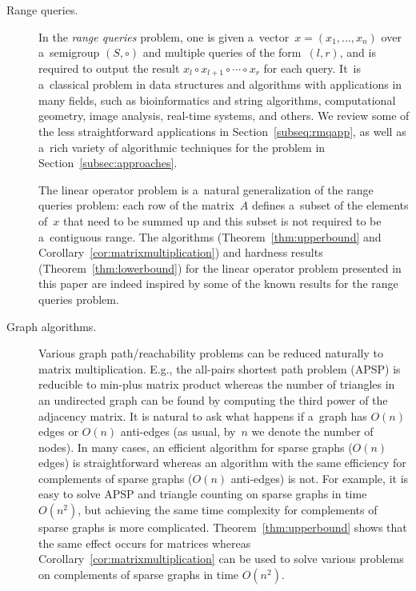 \documentclass[11pt,letterpaper]{article}
\begin{document}
\begin{description}
\item[Range queries.] In the \emph{range queries} problem,
one is given a~vector~$x=(x_1, \dotsc, x_n)$ over a~semigroup $(S, \circ)$ and
multiple queries of the form~$(l,r)$, and is required to
output the result $x_l \circ x_{l+1} \circ \dotsb \circ x_r$
for each query. It~is a~classical problem in data structures and
algorithms with applications in many fields, such as bioinformatics and
string algorithms, computational geometry, image analysis, real-time
systems, and others. We review some of the less straightforward applications in Section~\ref{subseq:rmqapp},
as well as a~rich variety of algorithmic techniques for the problem in
Section~\ref{subsec:approaches}.

The linear operator problem is a~natural generalization of the range queries
problem: each row of the matrix~$A$ defines a~subset of the elements of~$x$
that need to be summed up and this subset is not required to be
a~contiguous range. The algorithms (Theorem~\ref{thm:upperbound} and
Corollary~\ref{cor:matrixmultiplication}) and hardness results
(Theorem~\ref{thm:lowerbound}) for the linear operator problem presented in this
paper are indeed inspired by some of the known results for the range queries
problem.

\item[Graph algorithms.] Various graph path/reachability
problems can be reduced naturally to matrix multiplication.
E.g., the all-pairs shortest path problem (APSP) is reducible
to min-plus matrix product whereas the number of triangles in an
undirected graph can be found by computing the third power of the
adjacency matrix.
It is natural to ask what happens if
a~graph has $O(n)$ edges or $O(n)$ anti-edges
(as usual, by~$n$ we denote the number of nodes).
In many cases, an efficient algorithm
for sparse graphs ($O(n)$ edges) is straightforward
whereas an algorithm with the same efficiency
for complements of sparse graphs ($O(n)$ anti-edges) is not. For
example, it is easy to solve APSP and triangle counting on sparse graphs in
time $O(n^2)$, but achieving the same time complexity for complements of sparse
graphs is more complicated.
Theorem~\ref{thm:upperbound} shows that the same effect
occurs for matrices whereas
Corollary~\ref{cor:matrixmultiplication} can be used to
solve various problems on complements of
sparse graphs in time $O(n^2)$.


\end{description}
\end{document}
